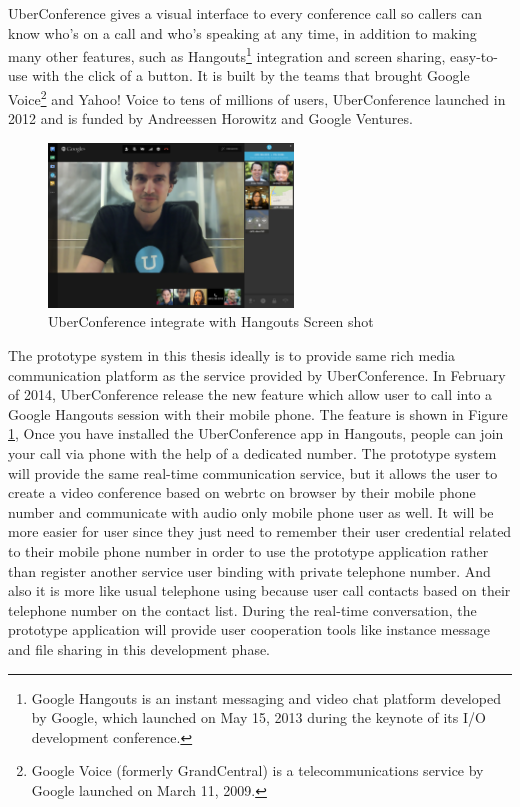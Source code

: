 \par UberConference gives a visual interface to every conference call so callers can know who's on a call and who's speaking at any time, in addition to making many other features, such as Hangouts\footnote{Google Hangouts is an instant messaging and video chat platform developed by Google, which launched on May 15, 2013 during the keynote of its I/O development conference.\cite{wiki:hangouts}} integration and screen sharing, easy-to-use with the click of a button. It is built by the teams that brought Google Voice\footnote{Google Voice (formerly GrandCentral) is a telecommunications service by Google launched on March 11, 2009.\cite{wiki:googleVoice}} and Yahoo! Voice to tens of millions of users, UberConference launched in 2012 and is funded by Andreessen Horowitz and Google Ventures.\cite{web:uberconference}

\begin{figure}
	\centering
    	\includegraphics[width=0.58\textwidth,natwidth=610,natheight=642]{figs/uberconference_hangout.jpg}
  	\caption{UberConference integrate with Hangouts Screen shot\cite{tnw:uberconference}}
  	\label{fig:uberconference}
\end{figure}

\par The prototype system in this thesis ideally is to provide same rich media communication platform as the service provided by UberConference. In February of 2014, UberConference release the new feature which allow user to call into a Google Hangouts session with their mobile phone. The feature is shown in Figure \ref{fig:uberconference}, Once you have installed the UberConference app in Hangouts, people can join your call via phone with the help of a dedicated number. The prototype system will provide the same real-time communication service, but it allows the user to create a video conference based on \gls{webrtc} on browser by their mobile phone number and communicate with audio only mobile phone user as well. It will be more easier for user since they just need to remember their user credential related to their mobile phone number in order to use the prototype application rather than register another service user binding with private telephone number. And also it is more like usual telephone using because user call contacts based on their telephone number on the contact list. During the real-time conversation, the prototype application will provide user cooperation tools like instance message and file sharing in this development phase.

